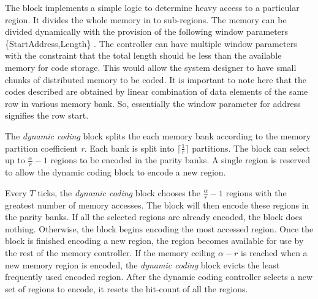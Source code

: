 The block implements a simple logic to determine heavy access to a particular 
region. It divides the whole memory in to sub-regions. The memory can be 
divided dynamically with the provision of the following window parameters 
\{StartAddress,Length\} . The controller can have multiple window parameters 
with the constraint that the total length should be less than the available 
memory for code storage. This would allow the system designer to have small 
chunks of distributed memory to be coded. It is important to note here that the 
codes described are obtained by linear combination of data elements of the same 
row in various memory bank. So, essentially the window parameter for address 
signifies the row start.

The {\em dynamic coding} block splits the each memory bank according to the memory partition coefficient {\em r}. Each bank is split into $\lceil\frac{1}{r}\rceil$ partitions. The block can select up to $\frac{\alpha}{r} - 1$ regions to be encoded in the parity banks. A single region is reserved to allow the dynamic coding block to encode a new region.

Every $T$ ticks, the {\em dynamic coding} block chooses the $\frac{\alpha}{r} - 1$ regions with the greatest number of memory accesses. The block will then encode these regions in the parity banks. If all the selected regions are already encoded, the block does nothing. Otherwise, the block begins encoding the most accessed region. Once the block is finished encoding a new region, the region becomes available for use by the rest of the memory controller. If the memory ceiling $\alpha - r$ is reached when a new memory region is encoded, the {\em dynamic coding} block evicts the least frequently used encoded region. After the dynamic coding controller selects a new set of regions to encode, it resets the hit-count of all the regions.

